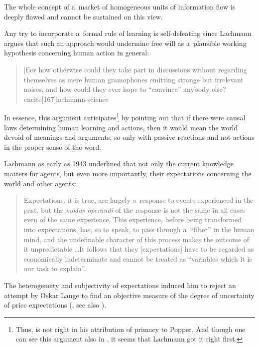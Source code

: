 {The whole concept of a~market of homogeneous units of information flow is deeply flawed and cannot be sustained on this view.

Any try to incorporate a~formal rule of learning is self-defeating since Lachmann argues that such an approach would undermine free will as a~plausible working hypothesis concerning human action in general:

\begin{quote}

[f]or how otherwise could they take part in discussions without regarding themselves as mere human gramophones emitting strange but irrelevant noises, and how could they ever hope to ``convince'' anybody else? encite[167]{lachmann-science}

\end{quote}

In essence, this argument anticipates\footnote{Thus, \textcite[38]{hoppe} is not right in his attribution of primacy to Popper. And though one can see this argument also in \textcite[104]{shackle-time}, it seems that Lachmann got it right first.} \textcite[10]{popper-poverty} by pointing out that if there were causal laws determining human learning and actions, then it would mean the world devoid of meanings and arguments, so only with passive reactions and not actions in the proper sense of the word.



Lachmann as early as 1943 underlined that not only the current knowledge matters for agents, but even more importantly, their expectations concerning the world and other agents:

\begin{quote}

Expectations, it is true, are largely a~response to events experienced in the past, but the \emph{modus operandi} of the response is not the same in all cases even of the same experience. This experience, before being transformed into expectations, has, so to speak, to pass through a~``filter'' in the human mind, and the undefinable character of this process makes the outcome of it unpredictable \ldots It follows that they [expectations] have to be regarded as economically indeterminate and cannot be treated as ``variables which it is our task to explain''\cite[67]{lachmann-role-expectations}.

\end{quote}

The heterogeneity and subjectivity of expectations induced him to reject an attempt by Oskar Lange to find an objective measure of the degree of uncertainty of price expectations (\cite[120]{lachmann-expectations}; see also \cite[422]{van-zijp}).



}
